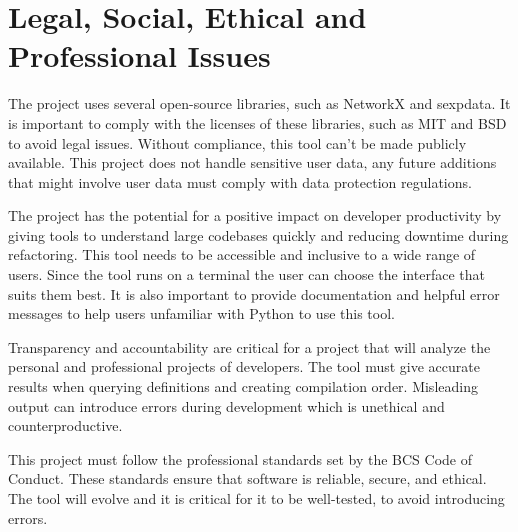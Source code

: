 
\chapter{Legal, Social, Ethical and Professional Issues}


The project uses several open-source libraries, such as NetworkX and sexpdata.
It is important to comply with the licenses of these libraries, such as MIT and
BSD to avoid legal issues. Without compliance, this tool can't be made publicly
available. This project does not handle sensitive user data, any future
additions that might involve user data must comply with data protection
regulations.

The project has the potential for a positive impact on developer productivity by
giving tools to understand large codebases quickly and reducing downtime
during refactoring. This tool needs to be accessible and
inclusive to a wide range of users. Since the tool runs on a terminal the user
can choose the interface that suits them best. It is also important to provide
documentation and helpful error messages to help users unfamiliar with Python
to use this tool.

Transparency and accountability are critical for a project that will analyze
the personal and professional projects of developers. The tool must give
accurate results when querying definitions and creating compilation order.
Misleading output can introduce errors during development which is unethical
and counterproductive.

This project must follow the professional standards set by the BCS Code of Conduct.
These standards ensure that software is reliable, secure, and ethical. The tool
will evolve and it is critical for it to be well-tested, to avoid
introducing errors.

%

